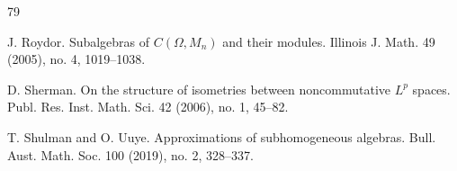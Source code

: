 \documentclass[leqno]{article} %
\numberwithin{equation}{section}
\begin{document}
\begin{thebibliography}{79}


J. Roydor.
\newblock Subalgebras of $C(\Omega,M_n)$ and their modules.
\newblock Illinois J. Math. 49 (2005), no. 4, 1019--1038.





D. Sherman.
\newblock On the structure of isometries between noncommutative $L^p$ spaces. 
\newblock  Publ. Res. Inst. Math. Sci. 42 (2006), no. 1, 45--82. 

T. Shulman and O. Uuye.
\newblock Approximations of subhomogeneous algebras. 
\newblock Bull. Aust. Math. Soc. 100 (2019), no. 2, 328--337. 







\end{thebibliography}
\end{document}
